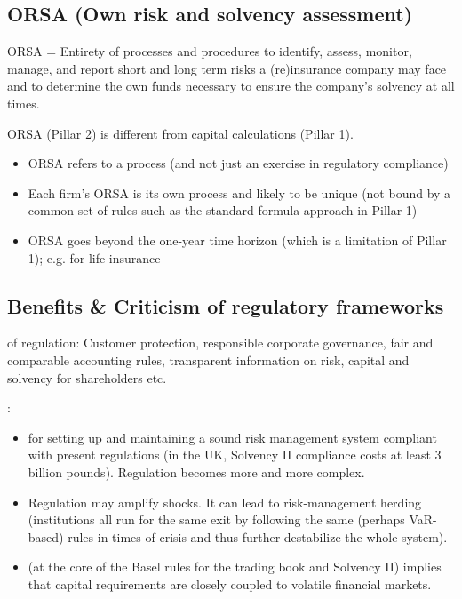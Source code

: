 \subsection*{ORSA (Own risk and solvency assessment)}
ORSA = Entirety of processes and procedures to identify, assess, monitor, manage, and report
short and long term risks a (re)insurance company may face and to determine the own funds
necessary to ensure the company’s solvency at all times.

ORSA (Pillar 2) is different from capital calculations (Pillar 1).
\begin{itemize}[leftmargin=*]
    \item ORSA refers to a process (and not just an exercise in regulatory compliance)
    \item Each firm’s ORSA is its own process and likely to be unique (not bound by a common set of rules such as the standard-formula approach in Pillar 1)
    \item ORSA goes beyond the one-year time horizon (which is a limitation of Pillar 1); e.g. for life insurance
\end{itemize}



\subsection*{Benefits \& Criticism of regulatory frameworks}
 of regulation: Customer protection, responsible corporate governance, fair and comparable accounting rules, transparent information on risk, capital and solvency for shareholders etc.

: 
\begin{itemize}[leftmargin=*]
    \item {} for setting up and maintaining a sound risk management system compliant with present regulations (in the UK, Solvency II compliance costs at least 3 billion pounds). Regulation becomes more and more complex.
    \item {} Regulation may amplify shocks. It can lead to risk-management herding (institutions all run for the same exit by following the same (perhaps VaR-based) rules in times of crisis and thus further destabilize the whole system).
    \item {} (at the core of the Basel rules for the trading book and Solvency II) implies that capital requirements are closely coupled to volatile financial markets.
\end{itemize}







